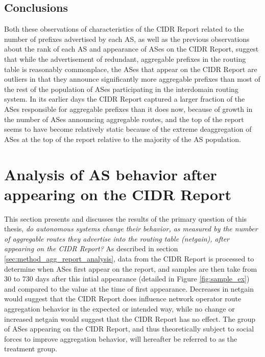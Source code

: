 
\subsection{Conclusions}

Both these observations of characteristics of the CIDR Report related to the
number of prefixes advertised by each AS, as well as the previous observations
about the rank of each AS and appearance of ASes on the CIDR Report, suggest
that while the advertisement of redundant, aggregable prefixes in the routing
table is reasonably commonplace, the ASes that appear on the CIDR Report are
outliers in that they announce significantly more aggregable prefixes than most
of the rest of the population of ASes participating in the interdomain routing
system. In its earlier days the CIDR Report captured a larger fraction of the
ASes responsible for aggregable prefixes than it does now, because of
growth in the number of ASes announcing aggregable routes, and the top of the
report seems to have become relatively static because of the extreme
deaggregation of ASes at the top of the report relative to the majority of the
AS population.

\section{Analysis of AS behavior after appearing on the CIDR Report}

This section presents and discusses the results of the primary question of this
thesis, \emph{do autonomous systems change their behavior, as measured by the
number of aggregable routes they advertise into the routing table (netgain),
after appearing on the CIDR Report?} As described in section
\ref{sec:method_agg_report_analysis}, data from the CIDR Report is processed to
determine when ASes first appear on the report, and samples are then take from
30 to 730 days after this intial appearance (detailed in Figure
\ref{fig:sample_ex}) and compared to the value at the time of first appearance.
Decreases in netgain would suggest that the CIDR Report does influence network
operator route aggregation behavior in the expected or intended way, while no
change or increased netgain would suggest that the CIDR Report has no effect.
The group of ASes appearing on the CIDR Report, and thus theoretically subject
to social forces to improve aggregation behavior, will hereafter be referred to
as the treatment group.

